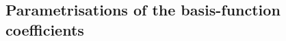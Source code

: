 \documentclass[article]{jss}
\def\mbf#1{{%
\mathchoice%
{\hbox{\boldmath$\displaystyle{#1}$}}%
{\hbox{\boldmath$\textstyle{#1}$}}%
{\hbox{\boldmath$\scriptstyle{#1}$}}%
{\hbox{\boldmath$\scriptscriptstyle{#1}$}}%
}}
\def\vec{\mbf}
\begin{document}
\begin{appendix}


\section{Parametrisations of the basis-function coefficients}
\label{Appendix:CovarianceTapering}


%
%

\end{appendix}
\end{document}
